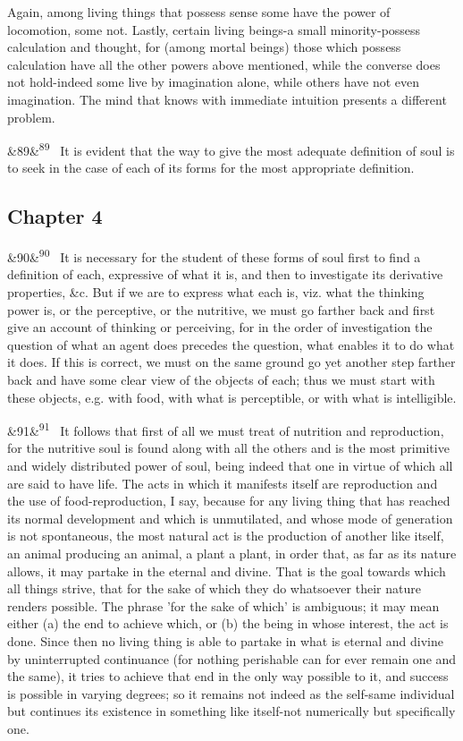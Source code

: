 \documentclass[12pt]{article}
\newcommand{\para}[1][]{\par\noindent\ifx&#1&\else\textsuperscript{\footnotesize #1}~\fi}
\begin{document}
Again, among living things that possess sense some have the power of locomotion, some not. Lastly, certain living beings-a small minority-possess calculation and thought, for (among mortal beings) those which possess calculation have all the other powers above mentioned, while the converse does not hold-indeed some live by imagination alone, while others have not even imagination. The mind that knows with immediate intuition presents a different problem.

\para[89] It is evident that the way to give the most adequate definition of soul is to seek in the case of each of its forms for the most appropriate definition.

\subsection*{Chapter 4}

\para[90] It is necessary for the student of these forms of soul first to find a definition of each, expressive of what it is, and then to investigate its derivative properties, \&c. But if we are to express what each is, viz. what the thinking power is, or the perceptive, or the nutritive, we must go farther back and first give an account of thinking or perceiving, for in the order of investigation the question of what an agent does precedes the question, what enables it to do what it does. If this is correct, we must on the same ground go yet another step farther back and have some clear view of the objects of each; thus we must start with these objects, e.g. with food, with what is perceptible, or with what is intelligible.

\para[91] It follows that first of all we must treat of nutrition and reproduction, for the nutritive soul is found along with all the others and is the most primitive and widely distributed power of soul, being indeed that one in virtue of which all are said to have life. The acts in which it manifests itself are reproduction and the use of food-reproduction, I say, because for any living thing that has reached its normal development and which is unmutilated, and whose mode of generation is not spontaneous, the most natural act is the production of another like itself, an animal producing an animal, a plant a plant, in order that, as far as its nature allows, it may partake in the eternal and divine. That is the goal towards which all things strive, that for the sake of which they do whatsoever their nature renders possible. The phrase 'for the sake of which' is ambiguous; it may mean either (a) the end to achieve which, or (b) the being in whose interest, the act is done. Since then no living thing is able to partake in what is eternal and divine by uninterrupted continuance (for nothing perishable can for ever remain one and the same), it tries to achieve that end in the only way possible to it, and success is possible in varying degrees; so it remains not indeed as the self-same individual but continues its existence in something like itself-not numerically but specifically one.
\end{document}
